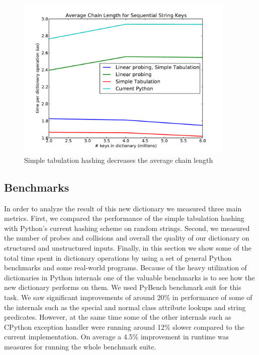 \documentclass[11pt]{article}
\begin{document}
\begin{figure}[H]
  \centering
  \includegraphics[width=4.1in]{chainlength.pdf}
  \caption{Simple tabulation hashing decreases the average chain length}
  \label{fig:chainlength}
\end{figure}

\subsection{Benchmarks}
In order to analyze the result of this new dictionary we measured three main metrics. First, we compared the performance of the simple tabulation hashing with Python’s current hashing scheme on random strings. Second, we measured the number of probes and collisions and overall the quality of our dictionary on structured and unstructured inputs. Finally, in this section  we show some of the total time spent in dictionary operations by using a set of general Python benchmarks and some real-world programs.
Because of the heavy utilization of dictionaries in Python internals one of the
valuable benchmarks is to see how the new dictionary performs on them. We used
PyBench benchmark suit for this task. We saw significant improvements of around
20\% in performance of some of the internals such as the special and normal
class attribute lookups and string predicates. However, at the same time some
of the other internals such as CPython exception handler were running around
12\% slower compared to the current implementation. On average a 4.5\% improvement in runtime was measures for running the whole benchmark suite.
\end{document}
